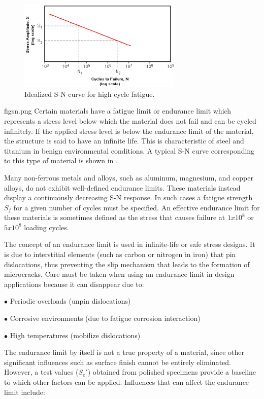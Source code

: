 \begin{figure}[h!]
	\centering
	\includegraphics[width=0.7\textwidth]{figures//basquin.png} 
	\caption{Idealized S-N curve for high cycle fatigue.}
	\label{fig.basquin}
\end{figure}
figsn.png
Certain materials have a fatigue limit or endurance limit which represents a stress level below
which the material does not fail and can be cycled infinitely. If the applied stress level is below
the endurance limit of the material, the structure is said to have an infinite life. This is
characteristic of steel and titanium in benign environmental conditions. A typical S-N curve
corresponding to this type of material is shown in .

Many non-ferrous metals and alloys, such as aluminum, magnesium, and copper alloys, do not
exhibit well-defined endurance limits. These materials instead display a continuously
decreasing S-N response. In such cases a fatigue strength $S_f$ for
a given number of cycles must be specified. An effective endurance limit for these materials is
sometimes defined as the stress that causes failure at $1x10^8$ or $5x10^8$ loading cycles.

The concept of an endurance limit is used in infinite-life or safe stress designs. It is due to
interstitial elements (such as carbon or nitrogen in iron) that pin dislocations, thus preventing
the slip mechanism that leads to the formation of microcracks. Care must be taken when
using an endurance limit in design applications because it can disappear due to:

\vspace{6pt}
$\bullet$ Periodic overloads (unpin dislocations)

$\bullet$ Corrosive environments (due to fatigue corrosion interaction)

$\bullet$ High temperatures (mobilize dislocations)
\vspace{6pt}     

The endurance limit by itself is not a true property of a material, since other significant influences such
as surface finish cannot be entirely eliminated. However, a test values ($S_e'$) obtained from
polished specimens provide a baseline to which other factors can be applied. Influences that
can affect the endurance limit include:

